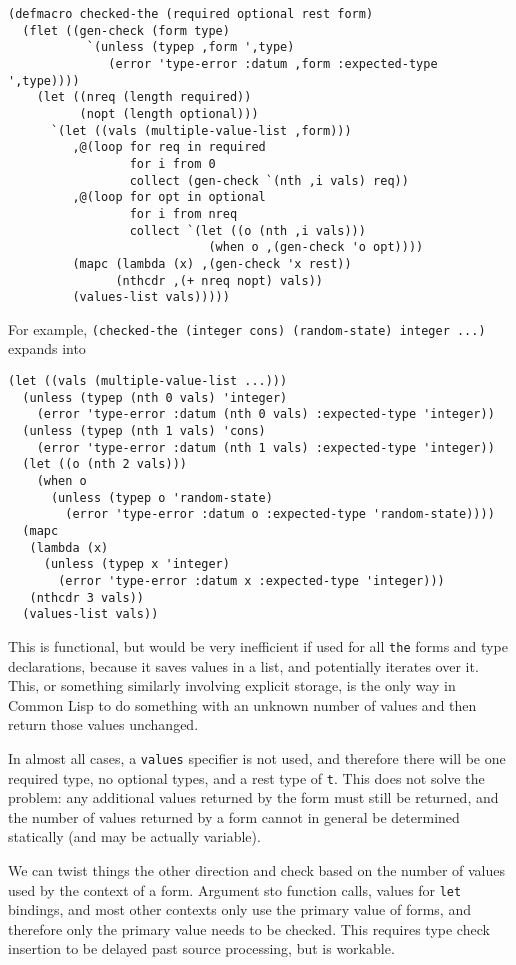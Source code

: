 \documentclass{article}
\begin{document}
\begin{lstlisting}
(defmacro checked-the (required optional rest form)
  (flet ((gen-check (form type)
           `(unless (typep ,form ',type)
              (error 'type-error :datum ,form :expected-type ',type))))
    (let ((nreq (length required))
          (nopt (length optional)))
      `(let ((vals (multiple-value-list ,form)))
         ,@(loop for req in required
                 for i from 0
                 collect (gen-check `(nth ,i vals) req))
         ,@(loop for opt in optional
                 for i from nreq
                 collect `(let ((o (nth ,i vals)))
                            (when o ,(gen-check 'o opt))))
         (mapc (lambda (x) ,(gen-check 'x rest))
               (nthcdr ,(+ nreq nopt) vals))
         (values-list vals)))))
\end{lstlisting}

For example, \texttt{(checked-the (integer cons) (random-state) integer ...)} expands into

\begin{lstlisting}
(let ((vals (multiple-value-list ...)))
  (unless (typep (nth 0 vals) 'integer)
    (error 'type-error :datum (nth 0 vals) :expected-type 'integer))
  (unless (typep (nth 1 vals) 'cons)
    (error 'type-error :datum (nth 1 vals) :expected-type 'integer))
  (let ((o (nth 2 vals)))
    (when o
      (unless (typep o 'random-state)
        (error 'type-error :datum o :expected-type 'random-state))))
  (mapc
   (lambda (x)
     (unless (typep x 'integer)
       (error 'type-error :datum x :expected-type 'integer)))
   (nthcdr 3 vals))
  (values-list vals))
\end{lstlisting}

This is functional, but would be very inefficient if used for all \texttt{the} forms and type declarations, because it saves values in a list, and potentially iterates over it. This, or something similarly involving explicit storage, is the only way in Common Lisp to do something with an unknown number of values and then return those values unchanged.

In almost all cases, a \texttt{values} specifier is not used, and therefore there will be one required type, no optional types, and a rest type of \texttt{t}. This does not solve the problem: any additional values returned by the form must still be returned, and the number of values returned by a form cannot in general be determined statically (and may be actually variable).

We can twist things the other direction and check based on the number of values used by the context of a form. Argument sto function calls, values for \texttt{let} bindings, and most other contexts only use the primary value of forms, and therefore only the primary value needs to be checked. This requires type check insertion to be delayed past source processing, but is workable.
\end{document}
